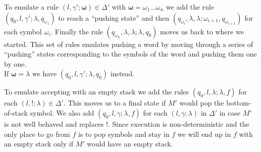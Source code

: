 \documentclass[defaultpackages]{simplereport}
\begin{document}
  To emulate a rule $(l, \gamma'; \bm{\omega}) \in \Delta'$ with
  $\bm{\omega} = \omega_1...\omega_n$ we add the rule $(q_0, l, \gamma';
  \lambda, q_{\omega_1})$ to reach a ``pushing state'' and then $(q_{\omega_i},
  \lambda, \lambda; \omega_{i+1}, q_{\omega_{i+1}})$ for each symbol $\omega_i$.
  Finally the rule $(q_{\omega_n}, \lambda, \lambda; \lambda, q_0)$ moves us
  back to where we started. This set of rules emulates pushing a word by moving
  through a series of ``pushing'' states corresponding to the symbols of the
  word and pushing them one by one.\\
  If $\bm{\omega} = \lambda$ we have $(q_0, l, \gamma'; \lambda, q_0)$ instead.
  
  To emulate accepting with an empty stack we add the rules $(q_0, l, \lambda; \lambda, f)$ for each $(l, !;
  \lambda) \in \Delta'$. This moves us to a final state if $M'$ would pop the
  bottom-of-stack symbol. We also add $(q_0, l, \gamma; \lambda, f)$ for each
  $(l, \gamma; \lambda)$ in $\Delta'$ in case $M'$ is not well behaved and
  replaces $!$. Since execution is non-deterministic and the only place to go
  from $f$ is to pop symbols and stay in $f$ we will end up in $f$ with an empty
  stack only if $M'$ would have an empty stack.
\end{document}
